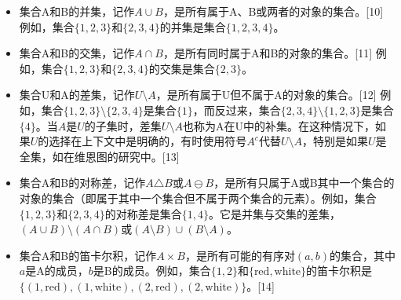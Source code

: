 \begin{itemize}
\item 集合A和B的并集，记作$A \cup B$，是所有属于A、B或两者的对象的集合。[10] 例如，集合$\{1, 2, 3\}$和$\{2, 3, 4\}$的并集是集合$\{1, 2, 3, 4\}$。
\item 集合A和B的交集，记作$A \cap B$，是所有同时属于A和B的对象的集合。[11] 例如，集合$\{1, 2, 3\}$和$\{2, 3, 4\}$的交集是集合$\{2, 3\}$。
\item 集合U和A的差集，记作$U \setminus A$，是所有属于U但不属于A的对象的集合。[12] 例如，集合$\{1, 2, 3\} \setminus \{2, 3, 4\}$是集合$\{1\}$，而反过来，集合$\{2, 3, 4\} \setminus \{1, 2, 3\}$是集合$\{4\}$。当$A$是$U$的子集时，差集$U \setminus A$也称为A在U中的补集。在这种情况下，如果$U$的选择在上下文中是明确的，有时使用符号$A^c$代替$U \setminus A$，特别是如果$U$是全集，如在维恩图的研究中。[13]
\item 集合A和B的对称差，记作$A \triangle B$或$A \ominus B$，是所有只属于A或B其中一个集合的对象的集合（即属于其中一个集合但不属于两个集合的元素）。例如，集合$\{1, 2, 3\}$和$\{2, 3, 4\}$的对称差是集合$\{1, 4\}$。它是并集与交集的差集，$(A \cup B) \setminus (A \cap B)$或$(A \setminus B) \cup (B \setminus A)$。
\item 集合A和B的笛卡尔积，记作$A \times B$，是所有可能的有序对$(a, b)$的集合，其中$a$是A的成员，$b$是B的成员。例如，集合$\{1, 2\}$和$\{\text{red}, \text{white}\}$的笛卡尔积是$\{(1, \text{red}), (1, \text{white}), (2, \text{red}), (2, \text{white})\}$。[14]
\end{itemize}